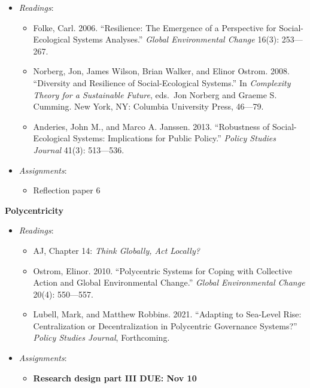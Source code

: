 \begin{itemize}

\item
  \emph{Readings}:

  \begin{itemize}
  
  \item
    Folke, Carl. 2006. ``Resilience: The Emergence of a Perspective for
    Social-Ecological Systems Analyses.'' \emph{Global Environmental
    Change} 16(3): 253---267.
  \item
    Norberg, Jon, James Wilson, Brian Walker, and Elinor Ostrom. 2008.
    ``Diversity and Resilience of Social-Ecological Systems.'' In
    \emph{Complexity Theory for a Sustainable Future}, eds.~Jon Norberg
    and Graeme S. Cumming. New York, NY: Columbia University Press,
    46---79.
  \item
    Anderies, John M., and Marco A. Janssen. 2013. ``Robustness of
    Social-Ecological Systems: Implications for Public Policy.''
    \emph{Policy Studies Journal} 41(3): 513---536.
  \end{itemize}
\item
  \emph{Assignments}:

  \begin{itemize}
  
  \item
    Reflection paper 6
  \end{itemize}
\end{itemize}

\week \textbf{Polycentricity}

\begin{itemize}

\item
  \emph{Readings}:

  \begin{itemize}
  
  \item
    AJ, Chapter 14: \emph{Think Globally, Act Locally?}
  \item
    Ostrom, Elinor. 2010. ``Polycentric Systems for Coping with
    Collective Action and Global Environmental Change.'' \emph{Global
    Environmental Change} 20(4): 550---557.
  \item
    Lubell, Mark, and Matthew Robbins. 2021. ``Adapting to Sea-Level
    Rise: Centralization or Decentralization in Polycentric Governance
    Systems?'' \emph{Policy Studies Journal}, Forthcoming.
  \end{itemize}
\item
  \emph{Assignments}:

  \begin{itemize}
  
  \item
    \textbf{Research design part III DUE: Nov 10}
  \end{itemize}
\end{itemize}

